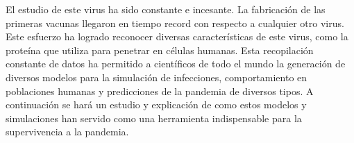 El estudio de este virus ha sido constante e incesante. La fabricación de las primeras vacunas llegaron en tiempo record con respecto a cualquier otro virus. Este esfuerzo ha logrado reconocer diversas características de este virus, como la proteína que utiliza para penetrar en células humanas. Esta recopilación constante de datos ha permitido a científicos de todo el mundo la generación de diversos modelos para la simulación de infecciones, comportamiento en poblaciones humanas y predicciones de la pandemia de diversos tipos. A continuación se hará un estudio y explicación de como estos modelos y simulaciones han servido como una herramienta indispensable para la supervivencia a la pandemia.